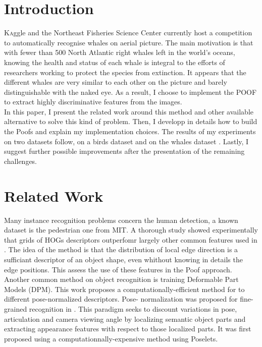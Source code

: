 \documentclass[twoside]{article}
\begin{document}
\begin{multicols}{2} %

\section{Introduction}

\lettrine[nindent=0em,lines=1]{K}aggle and the Northeast Fisheries Science Center currently host a competition to automatically recognise whales on aerial picture. The main motivation is that with fewer than 500 North Atlantic right whales left in the world's oceans, knowing the health and status of each whale is integral to the efforts of researchers working to protect the species from extinction. It appears that the different whales are very similar to each other on the picture and barely distinguishable with the naked eye.  As a result, I choose to implement the POOF to extract highly discriminative features from the images.\\

In this paper, I present the related work around this method and other available alternative to solve this kind of problem. Then, I developp in details how to build the Poofs and explain my implementation choices. The results of my experiments on two datasets follow, on a birds dataset \cite{cub} and on the whales dataset \cite{kag}. Lastly, I suggest further possible improvements after the presentation of the remaining challenges.


\section{Related Work}

Many instance recognition problems concern the human detection, a known dataset is the pedestrian one from MIT. A thorough study showed experimentally that grids of HOGs descriptors outperfomr largely other common features used in \cite{pedes}. The idea of the method is that the distribution of local edge direction is a sufficiant descriptor of an object shape, even whithout knowing in details the edge positions. This assess the use of these features in the Poof approach.\\

Another common method on object recognition is training Deformable Part Models (DPM). This work \cite{dpm} proposes a computationally-efficient method for to different pose-normalized descriptors. Pose- normalization was proposed for fine-grained recognition in \cite{birdlets}. This paradigm seeks to discount variations in pose, articulation and camera viewing angle by localizing semantic object parts and extracting appearance features with respect to those localized parts. It was first proposed using a computationnally-expensive method using Poselets.\\


\end{multicols}
\end{document}

